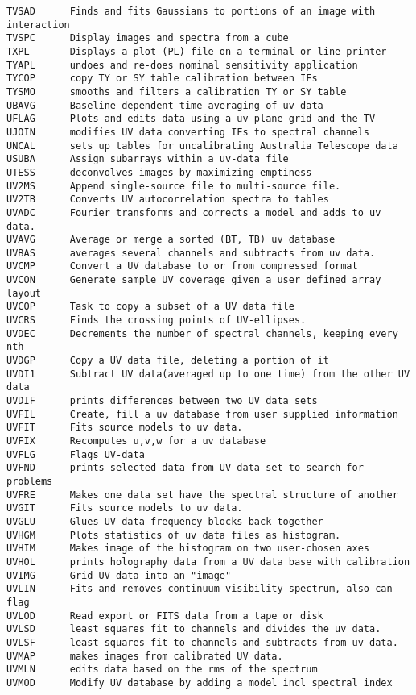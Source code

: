 \begin{verbatim}
TVSAD      Finds and fits Gaussians to portions of an image with interaction
TVSPC      Display images and spectra from a cube
TXPL       Displays a plot (PL) file on a terminal or line printer
TYAPL      undoes and re-does nominal sensitivity application
TYCOP      copy TY or SY table calibration between IFs
TYSMO      smooths and filters a calibration TY or SY table
UBAVG      Baseline dependent time averaging of uv data
UFLAG      Plots and edits data using a uv-plane grid and the TV
UJOIN      modifies UV data converting IFs to spectral channels
UNCAL      sets up tables for uncalibrating Australia Telescope data
USUBA      Assign subarrays within a uv-data file
UTESS      deconvolves images by maximizing emptiness
UV2MS      Append single-source file to multi-source file.
UV2TB      Converts UV autocorrelation spectra to tables
UVADC      Fourier transforms and corrects a model and adds to uv data.
UVAVG      Average or merge a sorted (BT, TB) uv database
UVBAS      averages several channels and subtracts from uv data.
UVCMP      Convert a UV database to or from compressed format
UVCON      Generate sample UV coverage given a user defined array layout
UVCOP      Task to copy a subset of a UV data file
UVCRS      Finds the crossing points of UV-ellipses.
UVDEC      Decrements the number of spectral channels, keeping every nth
UVDGP      Copy a UV data file, deleting a portion of it
UVDI1      Subtract UV data(averaged up to one time) from the other UV data
UVDIF      prints differences between two UV data sets
UVFIL      Create, fill a uv database from user supplied information
UVFIT      Fits source models to uv data.
UVFIX      Recomputes u,v,w for a uv database
UVFLG      Flags UV-data
UVFND      prints selected data from UV data set to search for problems
UVFRE      Makes one data set have the spectral structure of another
UVGIT      Fits source models to uv data.
UVGLU      Glues UV data frequency blocks back together
UVHGM      Plots statistics of uv data files as histogram.
UVHIM      Makes image of the histogram on two user-chosen axes
UVHOL      prints holography data from a UV data base with calibration
UVIMG      Grid UV data into an "image"
UVLIN      Fits and removes continuum visibility spectrum, also can flag
UVLOD      Read export or FITS data from a tape or disk
UVLSD      least squares fit to channels and divides the uv data.
UVLSF      least squares fit to channels and subtracts from uv data.
UVMAP      makes images from calibrated UV data.
UVMLN      edits data based on the rms of the spectrum
UVMOD      Modify UV database by adding a model incl spectral index

\end{verbatim}
